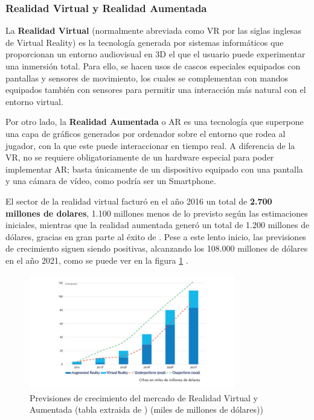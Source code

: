 \subsubsection{Realidad Virtual y Realidad Aumentada}
La \textbf{Realidad Virtual} (normalmente abreviada como VR por las siglas inglesas de Virtual Reality) es la tecnología generada por sistemas informáticos que proporcionan un entorno audiovisual en 3D el que el usuario puede experimentar una inmersión total. Para ello, se hacen usos de cascos especiales equipados con pantallas y sensores de movimiento, los cuales se complementan con mandos equipados también con sensores para permitir una interacción más natural con el entorno virtual.

Por otro lado, la \textbf{Realidad Aumentada} o AR es una tecnología que superpone una capa de gráficos generados por ordenador sobre el entorno que rodea al jugador, con la que este puede interaccionar en tiempo real. A diferencia de la VR, no se requiere obligatoriamente de un hardware especial para poder implementar AR; basta únicamente de un dispositivo equipado con una pantalla y una cámara de vídeo, como podría ser un Smartphone.

El sector de la realidad virtual facturó en el año 2016 un total de \textbf{2.700 millones de dolares}, 1.100 millones menos de lo previsto según las estimaciones iniciales, mientras que la realidad aumentada generó un total de 1.200 millones de dólares, gracias en gran parte al éxito de . Pese a este lento inicio, las previsiones de crecimiento siguen siendo positivas, alcanzando los 108.000 millones de dólares en el año 2021, como se puede ver en la figura \ref{crecimiento-vr} \cite{libro_blanco}.

\begin{figure}[h]
    \centering
    \includegraphics[width=0.8\textwidth]{images/estadodelarte/mercado/crecimiento-vr}
    \caption{Previsiones de crecimiento del mercado de Realidad Virtual y Aumentada (tabla extraida de \cite{libro_blanco})
(miles de millones de dólares))}
    \label{crecimiento-vr}
\end{figure}

